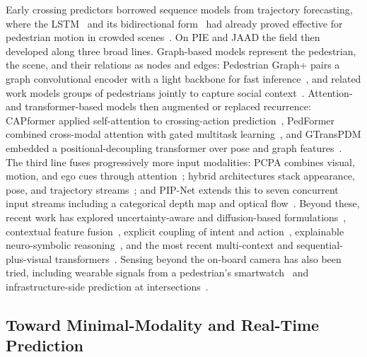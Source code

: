 \documentclass[mti,article,submit,moreauthors]{Definitions/mdpi}
\begin{document}
Early crossing predictors borrowed sequence models from trajectory forecasting, where the LSTM~\citep{hochreiter1997lstm} and its bidirectional form~\citep{graves2005framewise} had already proved effective for pedestrian motion in crowded scenes~\citep{alahi2016social}. On PIE and JAAD the field then developed along three broad lines. Graph-based models represent the pedestrian, the scene, and their relations as nodes and edges: Pedestrian Graph+ pairs a graph convolutional encoder with a light backbone for fast inference~\citep{cadena2022pedgraph}, and related work models groups of pedestrians jointly to capture social context~\citep{zou2025group}. Attention- and transformer-based models then augmented or replaced recurrence: CAPformer applied self-attention to crossing-action prediction~\citep{lorenzo2021capformer}, PedFormer combined cross-modal attention with gated multitask learning~\citep{rasouli2023pedformer}, and GTransPDM embedded a positional-decoupling transformer over pose and graph features~\citep{xie2025gtranspdm}. The third line fuses progressively more input modalities: PCPA combines visual, motion, and ego cues through attention~\citep{kotseruba2021benchmark}; hybrid architectures stack appearance, pose, and trajectory streams~\citep{rasouli2022multimodal,piccoli2020fussinet}; and PIP-Net extends this to seven concurrent input streams including a categorical depth map and optical flow~\citep{azarmi2025pipnet}. Beyond these, recent work has explored uncertainty-aware and diffusion-based formulations~\citep{chen2024pedcmt,liu2025occlusion}, contextual feature fusion~\citep{azarmi2023local}, explicit coupling of intent and action~\citep{yao2021coupling,zhou2023learning}, explainable neuro-symbolic reasoning~\citep{melocastillo2025neurosymbolic}, and the most recent multi-context and sequential-plus-visual transformers~\citep{li2025mft,landry2025trajfusionnet,liang2024tcl}. Sensing beyond the on-board camera has also been tried, including wearable signals from a pedestrian's smartwatch~\citep{abbasi2023watchped} and infrastructure-side prediction at intersections~\citep{abdelrahman2025vrucipi}.

\subsection{Toward Minimal-Modality and Real-Time Prediction}
\end{document}
